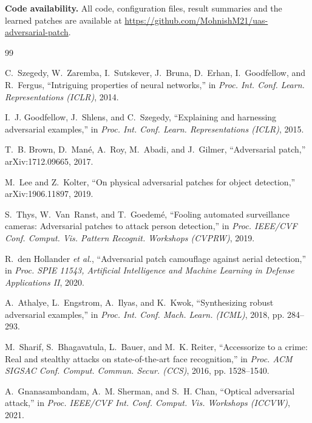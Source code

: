\documentclass[conference]{IEEEtran}
\begin{document}
\textbf{Code availability.} All code, configuration files, result summaries and the learned
patches are available at \url{https://github.com/MohnishM21/uas-adversarial-patch}.

\begin{thebibliography}{99}

C.~Szegedy, W.~Zaremba, I.~Sutskever, J.~Bruna, D.~Erhan, I.~Goodfellow, and R.~Fergus,
``Intriguing properties of neural networks,'' in \emph{Proc. Int. Conf. Learn.
Representations (ICLR)}, 2014.

I.~J. Goodfellow, J.~Shlens, and C.~Szegedy, ``Explaining and harnessing adversarial
examples,'' in \emph{Proc. Int. Conf. Learn. Representations (ICLR)}, 2015.

T.~B. Brown, D.~Man\'{e}, A.~Roy, M.~Abadi, and J.~Gilmer, ``Adversarial patch,''
arXiv:1712.09665, 2017.

M.~Lee and Z.~Kolter, ``On physical adversarial patches for object detection,''
arXiv:1906.11897, 2019.

S.~Thys, W.~Van~Ranst, and T.~Goedem\'{e}, ``Fooling automated surveillance cameras:
Adversarial patches to attack person detection,'' in \emph{Proc. IEEE/CVF Conf. Comput.
Vis. Pattern Recognit. Workshops (CVPRW)}, 2019.

R.~den Hollander \emph{et al.}, ``Adversarial patch camouflage against aerial detection,''
in \emph{Proc. SPIE 11543, Artificial Intelligence and Machine Learning in Defense
Applications II}, 2020.

A.~Athalye, L.~Engstrom, A.~Ilyas, and K.~Kwok, ``Synthesizing robust adversarial examples,''
in \emph{Proc. Int. Conf. Mach. Learn. (ICML)}, 2018, pp. 284--293.

M.~Sharif, S.~Bhagavatula, L.~Bauer, and M.~K. Reiter, ``Accessorize to a crime: Real and
stealthy attacks on state-of-the-art face recognition,'' in \emph{Proc. ACM SIGSAC Conf.
Comput. Commun. Secur. (CCS)}, 2016, pp. 1528--1540.

A.~Gnanasambandam, A.~M. Sherman, and S.~H. Chan, ``Optical adversarial attack,'' in
\emph{Proc. IEEE/CVF Int. Conf. Comput. Vis. Workshops (ICCVW)}, 2021.


\end{thebibliography}
\end{document}

